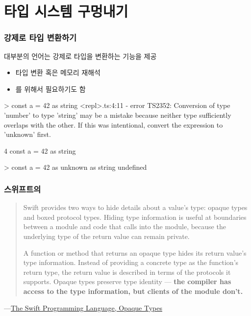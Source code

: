 \documentclass{beamer}
\begin{document}
\section{타입 시스템 구멍내기}
\begin{frame}[c, fragile]
  \frametitle{강제로 타입 변환하기}

  대부분의 언어는 강제로 타입을 변환하는 기능을 제공
  \begin{itemize}
    \item 타입 변환 혹은 메모리 재해석
    \item {}를 위해서 필요하기도 함
  \end{itemize}

  \begin{tscode}
> const a = 42 as string
<repl>.ts:4:11 - error TS2352: Conversion of type 'number' to type 'string' may be a mistake because neither type sufficiently overlaps with the other. If this was intentional, convert the expression to 'unknown' first.

4 const a = 42 as string
            ~~~~~~~~~~~~

> const a = 42 as unknown as string
undefined
  \end{tscode}
\end{frame}

\begin{frame}[c, fragile]
  \frametitle{스위프트의 }

  \begin{quotation}
Swift provides two ways to hide details about a value’s type: opaque types and boxed protocol types. Hiding type information is useful at boundaries between a module and code that calls into the module, because the underlying type of the return value can remain private.

A function or method that returns an opaque type hides its return value’s type information. Instead of providing a concrete type as the function’s return type, the return value is described in terms of the protocols it supports. Opaque types preserve type identity — \textbf{the compiler has access to the type information, but clients of the module don’t.}
  \end{quotation}
\hfill---\href{https://docs.swift.org/swift-book/documentation/the-swift-programming-language/opaquetypes/}{The Swift Programming Language, Opaque Types}
\end{frame}
\end{document}
